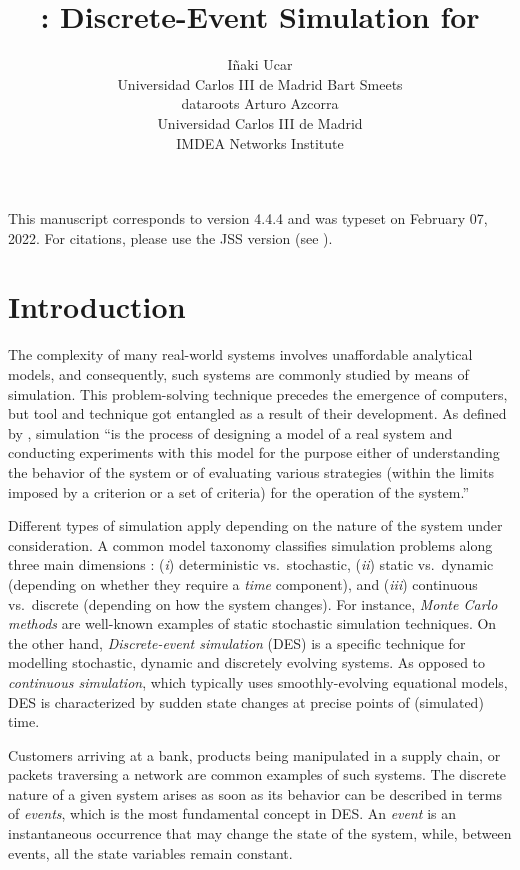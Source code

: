 \documentclass[
  nojss]{jss}
\author{
Iñaki Ucar\\Universidad Carlos III de Madrid \And Bart
Smeets\\dataroots \And Arturo Azcorra\\Universidad Carlos III de
Madrid\\
IMDEA Networks Institute
}
\title{\pkg{simmer}: Discrete-Event Simulation for \proglang{R}}
\begin{document}
\setlength{\abovedisplayskip}{0pt}

This manuscript corresponds to  version 4.4.4 and was
typeset on February 07, 2022. For citations, please use the JSS version
(see ).

\hypertarget{introduction}{%
\section{Introduction}\label{introduction}}

The complexity of many real-world systems involves unaffordable
analytical models, and consequently, such systems are commonly studied
by means of simulation. This problem-solving technique precedes the
emergence of computers, but tool and technique got entangled as a result
of their development. As defined by \citet{Shannon:1975:Systems},
simulation ``is the process of designing a model of a real system and
conducting experiments with this model for the purpose either of
understanding the behavior of the system or of evaluating various
strategies (within the limits imposed by a criterion or a set of
criteria) for the operation of the system.''

Different types of simulation apply depending on the nature of the
system under consideration. A common model taxonomy classifies
simulation problems along three main dimensions
\citep{Law:2000:Simulation}: (\emph{i}) deterministic vs.~stochastic,
(\emph{ii}) static vs.~dynamic (depending on whether they require a
\emph{time} component), and (\emph{iii}) continuous vs.~discrete
(depending on how the system changes). For instance, \emph{Monte Carlo
methods} are well-known examples of static stochastic simulation
techniques. On the other hand, \emph{Discrete-event simulation} (DES) is
a specific technique for modelling stochastic, dynamic and discretely
evolving systems. As opposed to \emph{continuous simulation}, which
typically uses smoothly-evolving equational models, DES is characterized
by sudden state changes at precise points of (simulated) time.

Customers arriving at a bank, products being manipulated in a supply
chain, or packets traversing a network are common examples of such
systems. The discrete nature of a given system arises as soon as its
behavior can be described in terms of \emph{events}, which is the most
fundamental concept in DES. An \emph{event} is an instantaneous
occurrence that may change the state of the system, while, between
events, all the state variables remain constant.
\end{document}
